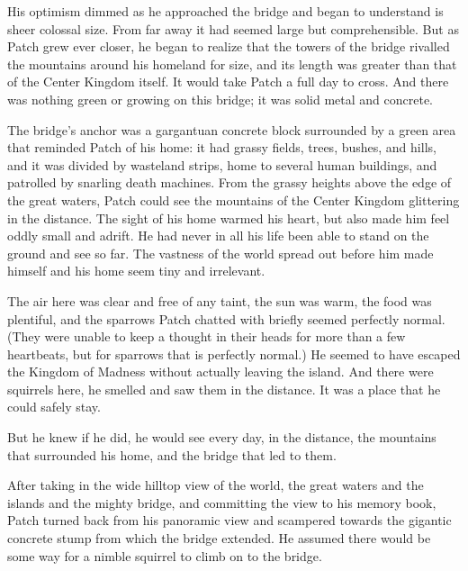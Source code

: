 \documentclass[ebook,oneside,openany,17pt]{memoir}
\newenvironment{tolerant}[1]{%
  \par\tolerance=#1\relax
}{%
  \par
}
\begin{document}
\begin{tolerant}{2000}
His optimism dimmed as he approached the bridge and began to
understand is sheer colossal size. From far away it had seemed large
but comprehensible. But as Patch grew ever closer, he began to realize
that the towers of the bridge rivalled the mountains around his
homeland for size, and its length was greater than that of the Center
Kingdom itself. It would take Patch a full day to cross. And there was
nothing green or growing on this bridge; it was solid metal and
concrete.
\end{tolerant}

\begin{tolerant}{1000}
The bridge’s anchor was a gargantuan concrete block surrounded by a
green area that reminded Patch of his home: it had grassy fields,
trees, bushes, and hills, and it was divided by wasteland strips, home
to several human buildings, and patrolled by snarling death
machines. From the grassy heights above the edge of the great waters,
Patch could see the mountains of the Center Kingdom glittering in the
distance. The sight of his home warmed his heart, but also made him
feel oddly small and adrift. He had never in all his life been able to
stand on the ground and see so far. The vastness of the world spread
out before him made himself and his home seem tiny and irrelevant.
\end{tolerant}

The air here was clear and free of any taint, the sun was warm, the
food was plentiful, and the sparrows Patch chatted with briefly seemed
perfectly normal. (They were unable to keep a thought in their heads
for more than a few heartbeats, but for sparrows that is perfectly
normal.) He seemed to have escaped the Kingdom of Madness without
actually leaving the island. And there were squirrels here, he smelled
and saw them in the distance. It was a place that he could safely
stay.

But he knew if he did, he would see every day, in the distance, the
mountains that surrounded his home, and the bridge that led to them.

\begin{tolerant}{1000}
After taking in the wide hilltop view of the world, the great waters
and the islands and the mighty bridge, and committing the view to his
memory book, Patch turned back from his panoramic view and scampered
towards the gigantic concrete stump from which the bridge extended. He
assumed there would be some way for a nimble squirrel to climb on to
the bridge.
\end{tolerant}
\end{document}
